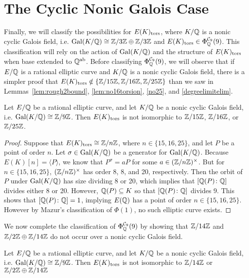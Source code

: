 \section{The Cyclic Nonic Galois Case\label{sec:noniccyclic}}

Finally, we will classify the possibilities for $E(K)_{\text{tors}}$, where $K/\mathbb{Q}$ is a nonic cyclic Galois field, i.e. $\operatorname{Gal}(K/\mathbb{Q}) \cong \mathbb{Z}/3\mathbb{Z} \oplus \mathbb{Z}/3\mathbb{Z}$ and $E(K)_{\text{tors}} \in \Phi_{\mathbb{Q}}^{\mathcal{C}_9}(9)$. This classification will rely on the action of $\operatorname{Gal}(K/\mathbb{Q})$ and the structure of $E(K)_{\text{tors}}$ when base extended to $\mathbb{Q}^{\text{ab}}$. Before classifying $\Phi_{\mathbb{Q}}^{\mathcal{C}_9}(9)$, we will observe that if $E/\mathbb{Q}$ is a rational elliptic curve and $K/\mathbb{Q}$ is a nonic cyclic Galois field, there is a simpler proof that $E(K)_{\text{tors}} \notin \{ \mathbb{Z}/15\mathbb{Z}, \mathbb{Z}/16\mathbb{Z}, \mathbb{Z}/25\mathbb{Z} \}$ than we saw in Lemmas~\ref{lem:rough2bound}, \ref{lem:no16torsion}, \ref{no25}, and \ref{degreelimitelim}. 


\begin{lem}
Let $E/\mathbb{Q}$ be a rational elliptic curve, and let $K/\mathbb{Q}$ be a nonic cyclic Galois field, i.e. $\operatorname{Gal}(K/\mathbb{Q}) \cong \mathbb{Z}/9\mathbb{Z}$. Then $E(K)_{\text{tors}}$ is not isomorphic to $\mathbb{Z}/15\mathbb{Z}$, $\mathbb{Z}/16\mathbb{Z}$, or $\mathbb{Z}/25\mathbb{Z}$.
\end{lem}

\begin{proof} 
Suppose that $E(K)_{\text{tors}} \cong \mathbb{Z}/n\mathbb{Z}$, where $n \in \{ 15, 16, 25 \}$, and let $P$ be a point of order $n$. Let $\sigma \in \operatorname{Gal}(K/\mathbb{Q})$ be a generator for $\operatorname{Gal}(K/\mathbb{Q})$. Because $E(K)[n]= \langle P \rangle$, we know that $P^\sigma= aP$ for some $a \in (\mathbb{Z}/n\mathbb{Z})^\times$. But for $n \in \{ 15, 16, 25 \}$, $(\mathbb{Z}/n\mathbb{Z})^\times$ has order 8, 8, and 20, respectively. Then the orbit of $P$ under $\operatorname{Gal}(K/\mathbb{Q})$ has size dividing 8 or 20, which implies that $[\mathbb{Q}(P) \colon \mathbb{Q}]$ divides either 8 or 20. However, $\mathbb{Q}(P) \subseteq K$ so that $[\mathbb{Q}(P) \colon \mathbb{Q}]$ divides 9. This shows that $[\mathbb{Q}(P) \colon \mathbb{Q}]= 1$, implying $E(\mathbb{Q})$ has a point of order $n \in \{ 15, 16, 25 \}$. However by Mazur's classification of $\Phi(1)$, no such elliptic curve exists. 
\end{proof} 


We now complete the classification of $\Phi_{\mathbb{Q}}^{\mathcal{C}_9}(9)$ by showing that $\mathbb{Z}/14\mathbb{Z}$ and $\mathbb{Z}/2\mathbb{Z} \oplus \mathbb{Z}/14\mathbb{Z}$ do not occur over a nonic cyclic Galois field. 


\begin{lem} \label{lem:nocyclic14-2-14}
Let $E/\mathbb{Q}$ be a rational elliptic curve, and let $K/\mathbb{Q}$ be a nonic cyclic Galois field, i.e. $\operatorname{Gal}(K/\mathbb{Q}) \cong \mathbb{Z}/9\mathbb{Z}$. Then $E(K)_{\text{tors}}$ is not isomorphic to $\mathbb{Z}/14\mathbb{Z}$ or $\mathbb{Z}/2\mathbb{Z} \oplus \mathbb{Z}/14\mathbb{Z}$  
\end{lem}

